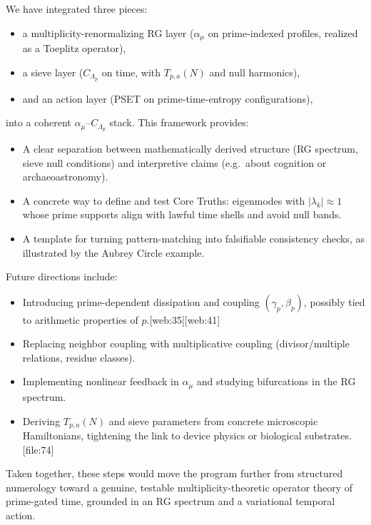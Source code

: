 \documentclass[11pt]{article}
\begin{document}
We have integrated three pieces:
\begin{itemize}
    \item a multiplicity-renormalizing RG layer ($\alpha_\mu$ on prime-indexed profiles, realized as a Toeplitz operator),
    \item a sieve layer ($C_{\Lambda_p}$ on time, with $T_{p,a}(N)$ and null harmonics),
    \item and an action layer (PSET on prime-time-entropy configurations),
\end{itemize}
into a coherent $\alpha_\mu$--$C_{\Lambda_p}$ stack.
This framework provides:
\begin{itemize}
    \item A clear separation between mathematically derived structure (RG spectrum, sieve null conditions) and interpretive claims (e.g.\ about cognition or archaeoastronomy).
    \item A concrete way to define and test Core Truths: eigenmodes with $|\lambda_k|\approx 1$ whose prime supports align with lawful time shells and avoid null bands.
    \item A template for turning pattern-matching into falsifiable consistency checks, as illustrated by the Aubrey Circle example.
\end{itemize}

Future directions include:
\begin{itemize}
    \item Introducing prime-dependent dissipation and coupling $(\gamma_p,\beta_p)$, possibly tied to arithmetic properties of $p$.[web:35][web:41]
    \item Replacing neighbor coupling with multiplicative coupling (divisor/multiple relations, residue classes).
    \item Implementing nonlinear feedback in $\alpha_\mu$ and studying bifurcations in the RG spectrum.
    \item Deriving $T_{p,a}(N)$ and sieve parameters from concrete microscopic Hamiltonians, tightening the link to device physics or biological substrates.[file:74]
\end{itemize}

Taken together, these steps would move the program further from structured numerology toward a genuine, testable multiplicity-theoretic operator theory of prime-gated time, grounded in an RG spectrum and a variational temporal action.
\end{document}
